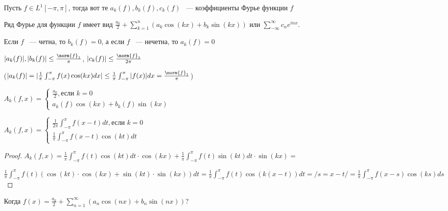 \begin{definition}
    Пусть $f\in L^1[-\pi, \pi]$, тогда вот те $a_k(f), b_k(f), c_k(f)$ ~--- коэффициенты Фурье функции $f$

    Ряд Фурье для функции $f$ имеет вид $\frac{a_0}{2} + \sum_{k = 1}^n(a_k \cos(kx) + b_k\sin(kx))$
    или $\sum_{-\infty}^\infty c_n e^{inx}$.
\end{definition}

\begin{observation}
    Если $f$ ~--- четна, то $b_k(f) = 0$, а если $f$ ~--- нечетна, то $a_k(f) = 0$

    $|a_k(f)|, |b_k(f)|\le \frac{\norm{f}_1}{\pi}$, $|c_k(f)|\le \frac{\norm{f}_1}{2\pi}$

    ($|a_k(f)| = |\frac{1}{\pi}\int_{-\pi}^\pi f(x)\cos(kx)dx|\le  \frac{1}{\pi}\int_{-\pi}^\pi |f(x)|dx = \frac{\norm{f}_1}{\pi}$)
\end{observation}

\begin{designation}
    $A_k(f, x) =\begin{cases}
            \frac{a_0}{2}, \text{если $k = 0$} \\
            a_k(f)\cos(kx) + b_k(f)\sin(kx)
        \end{cases} $
\end{designation}

\begin{observation}
    $A_k(f, x) =\begin{cases}
            \frac{1}{2\pi}\int_{-\pi}^\pi f(x-t)dt, \text{если $k = 0$} \\
            \frac{1}{\pi}\int_{-\pi}^\pi f(x-t)\cos(kt)dt
        \end{cases} $
\end{observation}

\begin{proof}
    $A_k(f, x) = \frac{1}{\pi}\int_{-\pi}^\pi f(t)\cos(kt)dt \cdot \cos(kx) + \frac{1}{\pi}\int_{-\pi}^\pi f(t)\sin(kt)dt\cdot \sin(kx) =$

    $ \frac{1}{\pi}\int_{-\pi}^\pi f(t)(\cos(kt)\cdot \cos(kx) + \sin(kt)\cdot\sin(kx))dt = \frac{1}{\pi}\int_{-\pi}^\pi f(t)\cos(k(x - t))dt = /s = x - t/ =
        \frac{1}{\pi}\int_{-\pi}^\pi f(x- s)\cos(ks)ds$
\end{proof}

Когда $f(x) = \frac{a_0}{2} + \sum_{n = 1}^\infty(a_n \cos(nx) + b_n\sin(nx))$?

